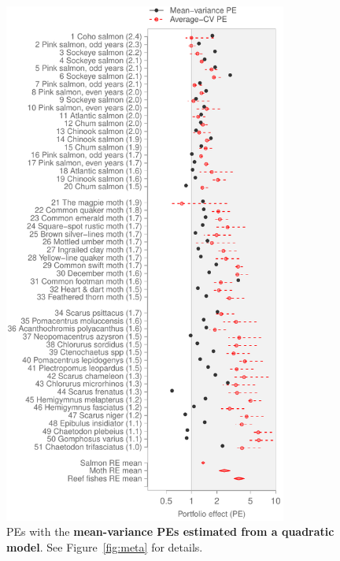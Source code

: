 \begin{figure}[htbp]
  \centering
  \includegraphics[height=6.8in]{prophets/PE_comparison_z_meta_taxa_quad_20121214.pdf}
  \caption{
    PEs with the \textbf{mean-variance PEs estimated from a quadratic model}.
    See Figure~\ref{fig:meta} for details.
}
\label{fig:meta-quad}
\end{figure}


